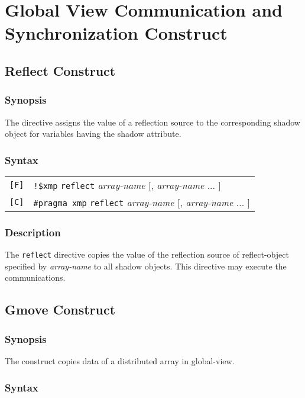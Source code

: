 \section{Global View Communication and Synchronization Construct}

\subsection{Reflect Construct}

\subsubsection*{Synopsis}

The {\tt {}} directive assigns the value of a
reflection source to the corresponding shadow object for variables
having the shadow attribute. 

\subsubsection*{Syntax}

\begin{tabular}{ll}
\verb![F]! & \verb|!$xmp| {\tt reflect} {\it array-name} [, {\it
  array-name} ... ] \\
\verb![C]! & \verb|#pragma xmp| {\tt reflect} {\it array-name} [, {\it
  array-name} ... ] \\
\end{tabular}

\subsubsection*{Description}

The {\tt reflect} directive copies the value of
the reflection source of reflect-object specified by {\it array-name} to all
shadow objects. This directive may execute the communications.

\subsection{Gmove Construct}
\subsubsection*{Synopsis}

The {\tt {}} construct copies data of a
distributed array in global-view. 

\subsubsection*{Syntax}

